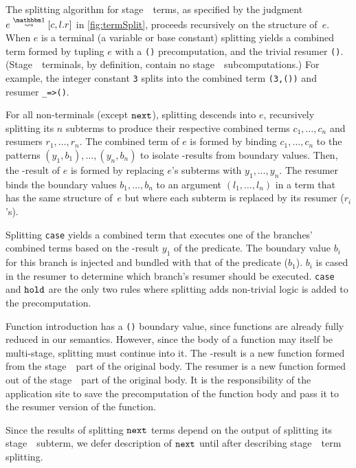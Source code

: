 \begin{concretesyntax}
The splitting algorithm for stage~\bbone\ terms, as specified by the
judgment $e \splitonesym [c,l.r]$ in \cref{fig:termSplit}, proceeds
recursively on the structure of~$e$.
When $e$ is a terminal (a variable or base constant)
splitting yields a combined term formed by tupling $e$ with a \texttt{()} precomputation, and the trivial resumer \texttt{()}. (Stage~\bbone\ terminals, by definition, contain no stage~\bbtwo\ subcomputations.)  For example, the integer constant \texttt{3} splits into the combined term \texttt{(3,())} and resumer \texttt{\_=>()}.


For all non-terminals (except ${\tt next}$),
splitting descends into $e$, recursively splitting its $n$ subterms
to produce their respective combined terms $c_1,\ldots,c_n$ and resumers $r_1, \ldots, r_n$.
The combined term of $e$ is formed by binding $c_1,\ldots,c_n$
to the patterns $(y_1,b_1),\ldots,(y_n,b_n)$
to isolate \bbone-results from boundary values. Then,
the \bbone-result of $e$ is formed by replacing $e$'s subterms with $y_1,\ldots,y_n$.
The resumer binds the boundary values $b_1,\ldots,b_n$ to an
argument $(l_1,\ldots,l_n)$ in a term that has the same structure
of~$e$ but where each subterm is replaced by its resumer ($r_i$'s).

Splitting {\tt case} yields a combined term that executes one of the branches' combined terms based on the \bbone-result $y_1$ of the predicate.
The boundary value $b_i$ for this branch is injected and bundled with that of the predicate ($b_1$).   
$b_i$ is cased in the resumer to determine which branch's resumer should be executed.
{\tt case} and ${\tt hold}$ are the only two rules where splitting adds non-trivial logic is added to the precomputation.

Function introduction has a \texttt{()} boundary value,
since functions are already fully reduced in our semantics.
However, since the body of a function may itself be multi-stage, splitting must continue into it.
The \bbone-result is a new function formed from the stage~\bbone\ part of the original body.
The resumer is a new function formed out of the stage~\bbtwo\ part of the original body.
It is the responsibility of the application site to save the precomputation of the function body
and pass it to the resumer version of the function.

Since the results of splitting ${\tt next}$ terms depend on the output of splitting its stage~\bbtwo\ subterm,
we defer description of ${\tt next}$ until after describing stage~\bbtwo\ term splitting.


\end{concretesyntax}
